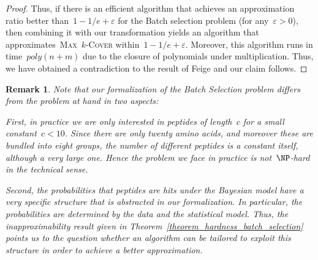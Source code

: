 \documentclass[11pt]{article}
\newtheorem{remark}{Remark}
\newcommand\maxkcover{\textsc{Max~$k$-Cover}\xspace}
\begin{document}
\begin{proof}
Thus, if there is an efficient algorithm that achieves an approximation ratio better than~$1 - 1/e + \varepsilon$ for the Batch selection problem (for any~$\varepsilon > 0$), then combining it with our transformation yields an algorithm that approximates~\maxkcover within~$1 - 1/e + \varepsilon$.
%
Moreover, this algorithm runs in time~$poly(n + m)$ due to the closure of polynomials under multiplication.
%
Thus, we have obtained a contradiction to the result of Feige and our claim follows.
\end{proof}
%
\begin{remark}
Note that our formalization of the Batch Selection problem differs from the problem at hand in two aspects:

First, in practice we are only interested in peptides of length~$c$ for a small constant~$c < 10$. Since there are only twenty amino acids, and moreover these are bundled into eight groups, the number of different peptides is a constant itself, although a very large one. Hence the problem we face in practice is not~$\NP$-hard in the   technical sense.

Second, the probabilities that peptides are hits under the Bayesian model have a very specific structure that is abstracted in our formalization. In particular, the probabilities are determined by the data \emph{and} the statistical model. 
%
Thus, the inapproximability result given in Theorem~\ref{theorem_hardness_batch_selection} points us to the question whether an algorithm can be tailored to exploit this structure in order to achieve a better approximation.
\end{remark}


\end{document}
